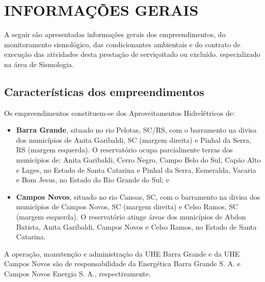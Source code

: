 \section{INFORMAÇÕES GERAIS}
A seguir são apresentadas informações gerais dos empreendimentos, do monitoramento sismológico, das condicionantes ambientais e do contrato de execução das atividades desta prestação de serviçoitado ou excluído. especializado na área de Sismologia.

\subsection{Características dos empreendimentos}
Os empreendimentos constituem-se dos Aproveitamentos Hidrelétricos de:
\begin{itemize}
    \item \textbf{Barra Grande}, situado no rio Pelotas, SC/RS, com o barramento na divisa dos municípios de Anita Garibaldi, SC (margem direita) e Pinhal da Serra, RS (margem esquerda). O reservatório ocupa parcialmente terras dos municípios de: Anita Garibaldi, Cerro Negro, Campo Belo do Sul, Capão Alto e Lages, no Estado de Santa Catarina e Pinhal da Serra, Esmeralda, Vacaria e Bom Jesus, no Estado do Rio Grande do Sul; e
    \item \textbf{Campos Novos}, situado no rio Canoas, SC, com o barramento na divisa dos municípios de Campos Novos, SC (margem direita) e Celso Ramos, SC (margem esquerda). O reservatório atinge áreas dos municípios de Abdon Batista, Anita Garibaldi, Campos Novos e Celso Ramos, no Estado de Santa Catarina.
\end{itemize}

\par{A operação, manutenção e administração da UHE Barra Grande e da UHE Campos Novos são de responsabilidade da Energética Barra Grande S. A. e Campos Novos Energia S. A., respectivamente.}

